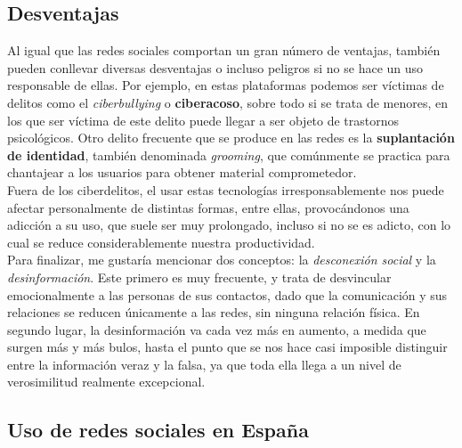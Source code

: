 \documentclass[12pt,a4paper]{article}
\begin{document}
\subsection{Desventajas}

Al igual que las redes sociales comportan un gran número de ventajas, también pueden conllevar diversas desventajas o incluso peligros si no se hace un uso responsable de ellas. Por ejemplo, en estas plataformas podemos ser víctimas de delitos como el \textit{ciberbullying} o \textbf{ciberacoso}, sobre todo si se trata de menores, en los que ser víctima de este delito puede llegar a ser objeto de trastornos psicológicos. Otro delito frecuente que se produce en las redes es la \textbf{suplantación de identidad}, también denominada \textit{grooming}, que comúnmente se practica para chantajear a los usuarios para obtener material comprometedor.\\

Fuera de los ciberdelitos, el usar estas tecnologías irresponsablemente nos puede afectar personalmente de distintas formas, entre ellas, provocándonos una adicción a su uso, que suele ser muy prolongado, incluso si no se es adicto, con lo cual se reduce considerablemente nuestra productividad.\\

Para finalizar, me gustaría mencionar dos conceptos: la \textit{desconexión social} y la \textit{desinformación}. Este primero es muy frecuente, y trata de desvincular emocionalmente a las personas de sus contactos, dado que la comunicación y sus relaciones se reducen únicamente a las redes, sin ninguna relación física. En segundo lugar, la desinformación va cada vez más en aumento, a medida que surgen más y más bulos, hasta el punto que se nos hace casi imposible distinguir entre la información veraz y la falsa, ya que toda ella llega a un nivel de verosimilitud realmente excepcional.

\subsection{Uso de redes sociales en España}

\begin{figure}[h]
	\centering
\end{figure}
\end{document}
